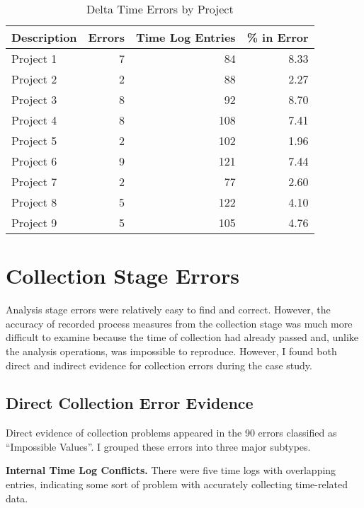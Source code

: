 \begin{table} [htbp] 
\begin{center}
\caption{\label{table:deltaErrors}Delta Time Errors by Project} 
\begin{tabular}{|l|r|r|r|}\hline 
Description & Errors & Time Log Entries & \% in Error \\ \hline\hline 
Project 1  & 7 &  84 &  8.33 \\ \hline 
Project 2  & 2 &  88 &  2.27 \\ \hline 
Project 3  & 8 &  92 &  8.70 \\ \hline 
Project 4  & 8 & 108 &  7.41 \\ \hline 
Project 5  & 2 & 102 &  1.96 \\ \hline 
Project 6  & 9 & 121 &  7.44 \\ \hline 
Project 7  & 2 &  77 &  2.60 \\ \hline 
Project 8  & 5 & 122 &  4.10 \\ \hline 
Project 9  & 5 & 105 &  4.76 \\ \hline 
\end{tabular}
\end{center} 
\end{table}
 

\section{Collection Stage Errors}

Analysis stage errors were relatively easy to find and correct.  However,
the accuracy of recorded process measures from the collection stage was
much more difficult to examine because the time of collection had already
passed and, unlike the analysis operations, was impossible to reproduce.
However, I found both direct and indirect evidence for collection errors
during the case study.

\subsection{\label{section:DirectCollection}Direct Collection Error Evidence}

Direct evidence of collection problems appeared in the 90 errors classified
as ``Impossible Values''.  I grouped these errors into three major
subtypes.
      
{\bf Internal Time Log Conflicts.} There were five time logs with
overlapping entries, indicating some sort of problem with accurately
collecting time-related data.

